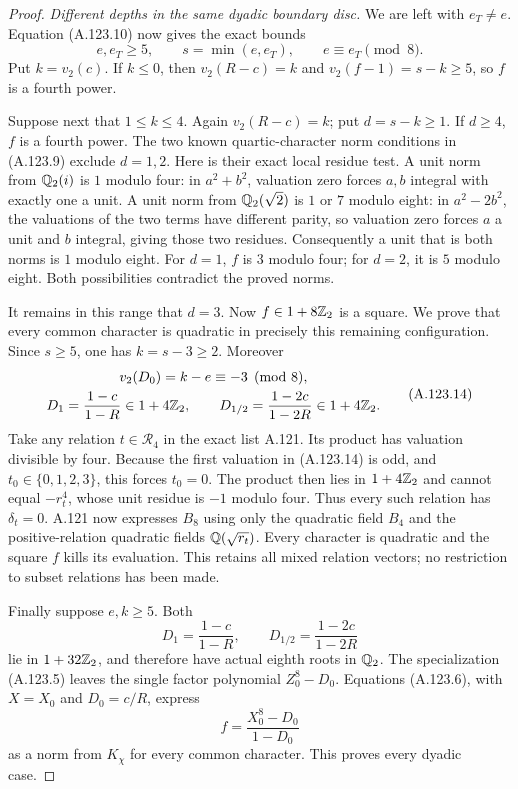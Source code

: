 \begin{proof}
\emph{Different depths in the same dyadic boundary disc.}
We are left with $e_T\ne e$.
Equation (A.123.10) now gives the exact bounds
\[
                 e,e_T\ge5,\qquad
                 s=\min(e,e_T),\qquad e\equiv e_T\pmod8.
\tag{A.123.13}
\]
Put $k=v_2(c)$.
If $k\le0$, then $v_2(R-c)=k$ and
$v_2(f-1)=s-k\ge5$, so $f$ is a fourth power.

Suppose next that $1\le k\le4$.
Again $v_2(R-c)=k$; put $d=s-k\ge1$.
If $d\ge4$, $f$ is a fourth power.
The two known quartic-character norm conditions in
(A.123.9) exclude $d=1,2$.
Here is their exact local residue test.
A unit norm from $\mathbb Q_2(i)$ is $1$ modulo four:
in $a^2+b^2$, valuation zero forces $a,b$ integral
with exactly one a unit.
A unit norm from $\mathbb Q_2(\sqrt2)$ is $1$ or $7$
modulo eight: in $a^2-2b^2$, the valuations of the
two terms have different parity, so valuation zero
forces $a$ a unit and $b$ integral, giving those
two residues.
Consequently a unit that is both norms is $1$
modulo eight.
For $d=1$, $f$ is $3$ modulo four; for $d=2$,
it is $5$ modulo eight.
Both possibilities contradict the proved norms.

It remains in this range that $d=3$.
Now $f\in1+8\mathbb Z_2$ is a square.
We prove that every common character is quadratic
in precisely this remaining configuration.
Since $s\ge5$, one has $k=s-3\ge2$.
Moreover
\[
 \begin{gathered}
 v_2(D_0)=k-e\equiv-3\pmod8,\\
 D_1=\frac{1-c}{1-R}\in1+4\mathbb Z_2,\qquad
 D_{1/2}=\frac{1-2c}{1-2R}\in1+4\mathbb Z_2.
 \end{gathered}
\tag{A.123.14}
\]
Take any relation $t\in\mathcal R_4$ in the exact
list A.121.
Its product has valuation divisible by four.
Because the first valuation in (A.123.14) is odd,
and $t_0\in\{0,1,2,3\}$, this forces $t_0=0$.
The product then lies in $1+4\mathbb Z_2$ and cannot equal
$-r_t^4$, whose unit residue is $-1$ modulo four.
Thus every such relation has $\delta_t=0$.
A.121 now expresses $B_8$ using only the quadratic
field $B_4$ and the positive-relation quadratic
fields $\mathbb Q(\sqrt{r_t})$.
Every character is quadratic and the square $f$
kills its evaluation.
This retains all mixed relation vectors; no
restriction to subset relations has been made.

Finally suppose $e,k\ge5$.
Both
\[
 D_1=\frac{1-c}{1-R},\qquad
 D_{1/2}=\frac{1-2c}{1-2R}
\tag{A.123.15}
\]
lie in $1+32\mathbb Z_2$, and therefore have actual eighth
roots in $\mathbb Q_2$.
The specialization (A.123.5) leaves the single
factor polynomial $Z_0^8-D_0$.
Equations (A.123.6), with $X=X_0$ and
$D_0=c/R$, express
\[
                         f=\frac{X_0^8-D_0}{1-D_0}
\tag{A.123.16}
\]
as a norm from $K_\chi$ for every common character.
This proves every dyadic case.


\end{proof}
